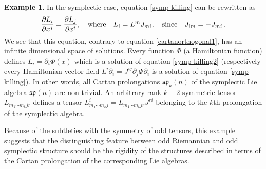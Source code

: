 \documentclass[12pt,reqno,a4paper]{amsart}
\theoremstyle{definition}
\newtheorem{example}{Example}[section]
\begin{document}
\begin{example}
In the symplectic case,
equation \eqref{symp killing} can be rewritten as
    \begin{equation}\label{symp killing2}
    {{\partial} L_i\over {\partial}  x^j}={{\partial} L_j\over {\partial}  x^i},\quad
{\rm where}\quad  L_i=L^m J_{mi},\quad{\rm since}\quad J_{im}=-J_{mi}\,.
    \end{equation}
We see that this equation, contrary to equation \eqref{cartanorthogonal1},
has an infinite dimensional space of solutions. Every function $\Phi$
(a Hamiltonian function) defines $L_i={\partial}_i\Phi(x)$
which is a solution of equation \eqref{symp killing2} (respectively
every Hamiltonian vector field $L^i{\partial}_i=J^{ij}{\partial}_j\Phi{\partial}_i$ is a solution
of equation \eqref{symp killing}).   In other words,
all Cartan prolongations $\mathfrak{sp}_k(n)$
of the symplectic Lie algebra $\mathfrak{sp}(n)$
are non-trivial. An arbitrary
rank $k+2$ symmetric tensor $L_{m_{1}\cdots m_{k}jr}$
defines a tensor $L^i_{m_{1}\cdots m_{k}j} =
L_{m_{1}\cdots m_{k}jr}J^{ri}$
belonging to the $k$th prolongation of the symplectic algebra.
\end{example}
Because of the subtleties with the symmetry of odd tensors, this example
suggests that the distinguishing feature between odd Riemannian and odd
symplectic structure should be the rigidity of the structures described in
terms of the Cartan prolongation of the corresponding Lie algebras.
\end{document}
